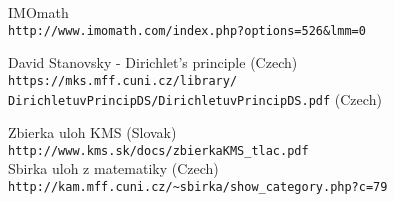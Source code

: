 \documentclass[12pt,a4paper]{article}
\begin{document}
\begin{thebibliography}{9}
IMOmath\\
\texttt{http://www.imomath.com/index.php?options=526\&lmm=0}

David Stanovsky - Dirichlet's principle (Czech) \\
\texttt{https://mks.mff.cuni.cz/library/\\DirichletuvPrincipDS/DirichletuvPrincipDS.pdf} (Czech)

Zbierka uloh KMS (Slovak) \\
\texttt{http://www.kms.sk/docs/zbierkaKMS\_tlac.pdf} \\ 


Sbirka uloh z matematiky (Czech)\\
\texttt{http://kam.mff.cuni.cz/\~{}sbirka/show\_category.php?c=79}
\end{thebibliography}
\end{document}
